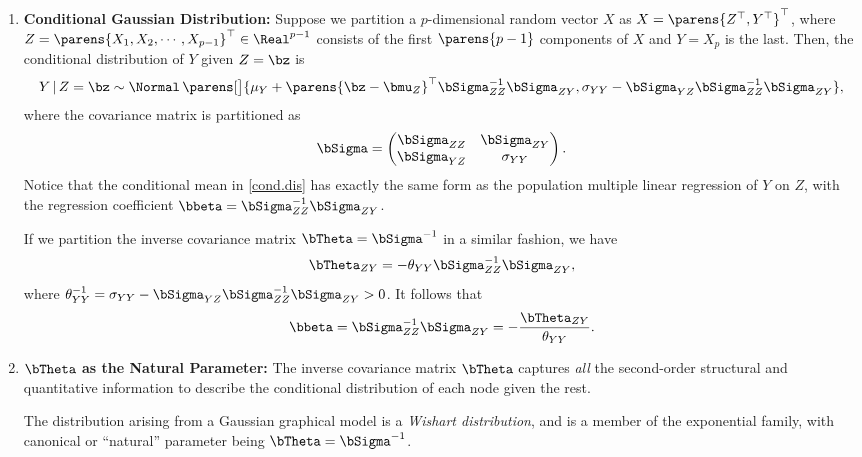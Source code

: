 \documentclass[12pt]{article}
\begin{document}
\begin{enumerate}[label=\textbf{\arabic*.}]
	\item \textbf{Conditional Gaussian Distribution:} Suppose we partition a $p$-dimensional random vector $X$ as $X = \parens{Z^\top, Y^\top}^\top$, where $Z = \parens{X_1, X_2, \cdots, X_{p-1}}^\top \in \Real^{p-1}$ consists of the first $\parens{p-1}$ components of $X$ and $Y = X_p$ is the last. Then, the conditional distribution of $Y$ given $Z = \bz$ is 
	\begin{align}\label{cond.dis}
		Y \,\vert\, Z = \bz \sim \Normal \, \parens[\big]{\mu_Y + \parens{\bz - \bmu_Z}^\top \bSigma_{ZZ}^{-1} \bSigma_{ZY}, \sigma_{YY} - \bSigma_{YZ} \bSigma_{ZZ}^{-1} \bSigma_{ZY}}, 
	\end{align}
	where the covariance matrix is partitioned as 
	\begin{align}
		\bSigma = \begin{pmatrix}
			\bSigma_{ZZ} & \bSigma_{ZY} \\ 
			\bSigma_{YZ} & \sigma_{YY}
		\end{pmatrix}. 
	\end{align}
	Notice that the conditional mean in \eqref{cond.dis} has exactly the same form as the population multiple linear regression of $Y$ on $Z$, with the regression coefficient $\bbeta = \bSigma_{ZZ}^{-1} \bSigma_{ZY}$. 
	
	If we partition the inverse covariance matrix $\bTheta = \bSigma^{-1}$ in a similar fashion, we have 
	\begin{align}
		\bTheta_{ZY} = - \theta_{YY} \bSigma_{ZZ}^{-1} \bSigma_{ZY}, 
	\end{align}
	where $\theta_{YY}^{-1} = \sigma_{YY} - \bSigma_{YZ} \bSigma_{ZZ}^{-1} \bSigma_{ZY} > 0$. It follows that 
	\begin{align}
		\bbeta = \bSigma_{ZZ}^{-1} \bSigma_{ZY} = - \frac{\bTheta_{ZY}}{\theta_{YY}}. 
	\end{align}
	
	\item \textbf{$\bTheta$ as the Natural Parameter:} The inverse covariance matrix $\bTheta$ captures \emph{all} the second-order structural and quantitative information to describe the conditional distribution of each node given the rest. 
	
	The distribution arising from a Gaussian graphical model is a \textit{Wishart distribution}, and is a member of the exponential family, with canonical or ``natural'' parameter being $\bTheta = \bSigma^{-1}$. 

\end{enumerate}
\end{document}
